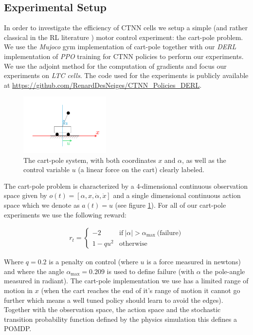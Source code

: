 \subsection{Experimental Setup}

In order to investigate the efficiency of CTNN cells we setup a simple (and rather classical in the RL literature \cite{cartpoleSutton}) motor control experiment: the cart-pole problem. We use the \textit{Mujoco} gym implementation of cart-pole together with our \textit{DERL} implementation of \textit{PPO} training for CTNN policies to perform our experiments. We use the adjoint method for the computation of gradients and focus our experiments on \textit{LTC cells}. The code used for the experiments is publicly available at \url{https://github.com/RenardDesNeiges/CTNN_Policies_DERL}.\\

\begin{figure}[h!]
    \centering
    \includegraphics[width=0.4\textwidth]{figures/cartpole.pdf}
    \caption{The cart-pole system, with both coordinates $x$ and $\alpha$, as well as the control variable $u$ (a linear force on the cart) clearly labeled.}
    \label{fig:cartpole_scheme}
\end{figure}

The cart-pole problem is characterized by a 4-dimensional continuous observation space given by $o(t)=[\alpha,x,\dot{\alpha},\dot{x}]$ and a single dimensional continuous action space which we denote as $a(t) = u$ (see figure \ref{fig:cartpole_scheme}). For all of our cart-pole experiments we use the following reward: 

\begin{align*}
    r_t = 
    \begin{cases}
        -2 & \text{if} ~|\alpha|>\alpha_\text{max} ~\text{(failure)}\\
        1-q u^2 & \text{otherwise} 
    \end{cases}
\end{align*}

Where $q=0.2$ is a penalty on control (where $u$ is a force measured in newtons) and where the angle $\alpha_\text{max}=0.209$ is used to define failure (with $\alpha$ the pole-angle measured in radiant). The cart-pole implementation we use has a limited range of motion in $x$ (when the cart reaches the end of it's range of motion it cannot go further which means a well tuned policy should learn to avoid the edges). Together with the observation space, the action space and the stochastic transition probability function defined by the physics simulation this defines a POMDP. \\

